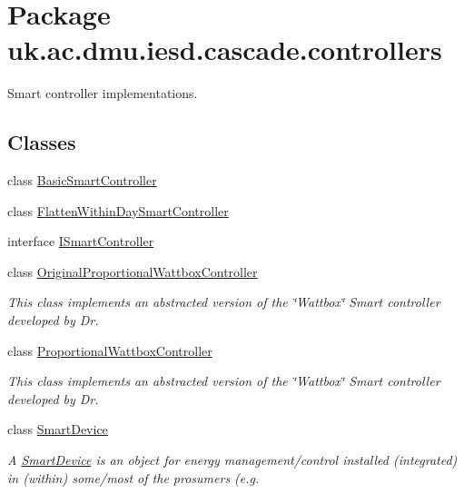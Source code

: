\hypertarget{namespaceuk_1_1ac_1_1dmu_1_1iesd_1_1cascade_1_1controllers}{\section{Package uk.\-ac.\-dmu.\-iesd.\-cascade.\-controllers}
\label{namespaceuk_1_1ac_1_1dmu_1_1iesd_1_1cascade_1_1controllers}
}


Smart controller implementations.  


\subsection*{Classes}
\begin{DoxyCompactItemize}
\item 
class \hyperlink{classuk_1_1ac_1_1dmu_1_1iesd_1_1cascade_1_1controllers_1_1_basic_smart_controller}{Basic\-Smart\-Controller}
\item 
class \hyperlink{classuk_1_1ac_1_1dmu_1_1iesd_1_1cascade_1_1controllers_1_1_flatten_within_day_smart_controller}{Flatten\-Within\-Day\-Smart\-Controller}
\item 
interface \hyperlink{interfaceuk_1_1ac_1_1dmu_1_1iesd_1_1cascade_1_1controllers_1_1_i_smart_controller}{I\-Smart\-Controller}
\item 
class \hyperlink{classuk_1_1ac_1_1dmu_1_1iesd_1_1cascade_1_1controllers_1_1_original_proportional_wattbox_controller}{Original\-Proportional\-Wattbox\-Controller}
\begin{DoxyCompactList}\small\item\em This class implements an abstracted version of the \char`\"{}\-Wattbox\char`\"{} Smart controller developed by Dr. \end{DoxyCompactList}\item 
class \hyperlink{classuk_1_1ac_1_1dmu_1_1iesd_1_1cascade_1_1controllers_1_1_proportional_wattbox_controller}{Proportional\-Wattbox\-Controller}
\begin{DoxyCompactList}\small\item\em This class implements an abstracted version of the \char`\"{}\-Wattbox\char`\"{} Smart controller developed by Dr. \end{DoxyCompactList}\item 
class \hyperlink{classuk_1_1ac_1_1dmu_1_1iesd_1_1cascade_1_1controllers_1_1_smart_device}{Smart\-Device}
\begin{DoxyCompactList}\small\item\em A {\itshape \hyperlink{classuk_1_1ac_1_1dmu_1_1iesd_1_1cascade_1_1controllers_1_1_smart_device}{Smart\-Device}} is an object for energy management/control installed (integrated) in (within) some/most of the prosumers (e.\-g. \end{DoxyCompactList}\item 

\end{DoxyCompactItemize}
